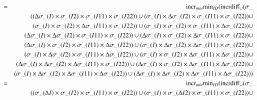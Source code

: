 \begin{eqnarray*}
&=& \algincr_{min} \algmin_{ID} (\algincrdiff_{\cup} (\sigma_{ \dots} \\ &&(
(\Delta\sigma_{\dots}(I) \times \sigma_{\dots}(I2) \times  \sigma_{\dots}(I11) \times  \sigma_{\dots}(I22)) \cup 
(\sigma_{\dots}(I) \times \Delta  \sigma_{\dots}(I2) \times   \sigma_{\dots}(I11) \times   \sigma_{\dots}(I22)) \cup \\
&&(\sigma_{\dots}(I) \times   \sigma_{\dots}(I2) \times \Delta  \sigma_{\dots}(I11) \times   \sigma_{\dots}(I22)) \cup 
(\sigma_{\dots}(I) \times   \sigma_{\dots}(I2) \times   \sigma_{\dots}(I11) \times \Delta  \sigma_{\dots}(I22)) \cup \\
&&(\Delta\sigma_{\dots}(I) \times \Delta  \sigma_{\dots}(I2) \times   \sigma_{\dots}(I11) \times   \sigma_{\dots}(I22)) \cup 
(\Delta\sigma_{\dots}(I) \times   \sigma_{\dots}(I2) \times \Delta  \sigma_{\dots}(I11) \times   \sigma_{\dots}(I22)) \cup \\
&&(\Delta\sigma_{\dots}(I) \times   \sigma_{\dots}(I2) \times   \sigma_{\dots}(I11) \times \Delta  \sigma_{\dots}(I22)) \cup 
(\sigma_{\dots}(I) \times \Delta  \sigma_{\dots}(I2) \times \Delta  \sigma_{\dots}(I11) \times   \sigma_{\dots}(I22)) \cup \\
&&(\sigma_{\dots}(I) \times \Delta  \sigma_{\dots}(I2) \times   \sigma_{\dots}(I11) \times \Delta  \sigma_{\dots}(I22)) \cup 
(\sigma_{\dots}(I) \times   \sigma_{\dots}(I2) \times \Delta  \sigma_{\dots}(I11) \times \Delta  \sigma_{\dots}(I22)) \cup \\
&&(\Delta\sigma_{\dots}(I) \times \Delta  \sigma_{\dots}(I2) \times \Delta  \sigma_{\dots}(I11) \times   \sigma_{\dots}(I22)) \cup 
(\Delta\sigma_{\dots}(I) \times   \sigma_{\dots}(I2) \times \Delta  \sigma_{\dots}(I11) \times \Delta  \sigma_{\dots}(I22)) \cup \\
&&(\sigma_{\dots}(I) \times \Delta  \sigma_{\dots}(I2) \times \Delta  \sigma_{\dots}(I11) \times \Delta  \sigma_{\dots}(I22)) \cup 
(\Delta\sigma_{\dots}(I) \times \Delta  \sigma_{\dots}(I2) \times \Delta  \sigma_{\dots}(I11) \times \Delta  \sigma_{\dots}(I22))) \\
%
&=& \algincr_{min} \algmin_{ID} (\algincrdiff_{\cup} (\sigma_{ \dots} \\ &&(
(\sigma_{\dots}(\Delta I) \times   \sigma_{\dots}(I2) \times   \sigma_{\dots}(I11) \times   \sigma_{\dots}(I22)) \cup 
(\sigma_{\dots}(I) \times   \sigma_{\dots}(\Delta I2) \times   \sigma_{\dots}(I11) \times   \sigma_{\dots}(I22)) \cup \\

\end{eqnarray*}
